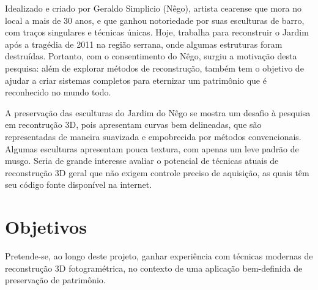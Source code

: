 

Idealizado e criado por Geraldo Simplicio (Nêgo), artista cearense que mora no
local a mais de 30 anos, e que ganhou notoriedade por suas esculturas de barro,
com traços singulares e técnicas únicas. Hoje, trabalha para reconstruir o
Jardim após a tragédia de 2011 na região serrana, onde algumas estruturas foram
destruídas. Portanto, com o consentimento do Nêgo, surgiu a motivação desta
pesquisa: além de explorar métodos de reconstrução, também tem o objetivo de
ajudar a criar sistemas completos para eternizar um patrimônio que é reconhecido
no mundo todo.

A preservação das esculturas do Jardim do Nêgo se mostra um desafio à pesquisa em
recontrução 3D, pois apresentam curvas bem delineadas, que são 
representadas de maneira suavizada e empobrecida por métodos convencionais.
Algumas esculturas apresentam pouca textura, com apenas um leve padrão de musgo.
Seria de grande interesse avaliar o potencial de técnicas atuais de
reconstrução 3D geral que não exigem controle preciso de aquisição, as quais têm seu código fonte
disponível na internet.

\newpage

\section{Objetivos}\label{sec:objetivos}

Pretende-se, ao longo deste projeto, ganhar experiência com técnicas
modernas de reconstrução 3D fotogramétrica, no contexto de uma aplicação
bem-definida de preservação de patrimônio. 


